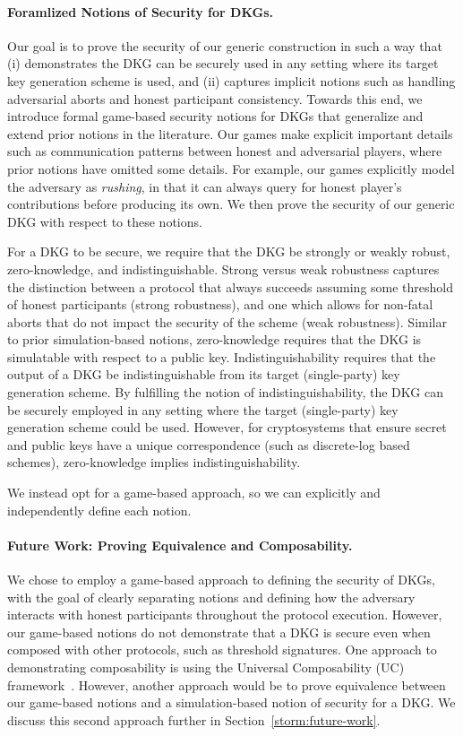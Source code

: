\paragraph{Foramlized Notions of Security for DKGs.}
Our goal is to prove the security of our generic construction in such a way that
(i) demonstrates the DKG can be securely used in any setting where its target key generation scheme is used,
and (ii) captures implicit notions such as handling adversarial aborts and honest participant consistency.
Towards this end,
we introduce formal game-based security notions for DKGs
that generalize and extend prior notions in the literature.
Our games make explicit important details such as communication patterns between honest and adversarial players,
where prior notions have omitted some details.
For example,
our games explicitly model the adversary as \emph{rushing},
in that it can always query for honest player's contributions before producing its own.
We then prove the security of our generic DKG with respect to these notions.

For a DKG to be secure, we require that the DKG  be strongly or weakly robust,
zero-knowledge, and
indistinguishable.
Strong versus weak robustness captures the distinction between a protocol that always succeeds assuming some threshold of honest participants (strong robustness),
and one which allows for non-fatal aborts that do not impact the security of the scheme (weak robustness).
Similar to prior simulation-based notions,
zero-knowledge requires that the DKG is simulatable with respect to a public
key.
Indistinguishability requires that the output of a DKG be indistinguishable from its target (single-party) key generation scheme.
By fulfilling the notion of indistinguishability,
the DKG can be securely employed in any setting where the target (single-party) key generation scheme could be used.
However,
for cryptosystems that ensure secret and public keys have a unique correspondence (such as discrete-log based schemes),
zero-knowledge implies indistinguishability.
%

We instead opt for a game-based approach,
so we can explicitly and independently define each notion.


\paragraph{Future Work: Proving Equivalence and Composability.}
We chose to employ a game-based approach to defining the security of DKGs,
with the goal of clearly separating notions and defining how the adversary interacts with honest participants throughout the protocol execution.
However, our game-based notions do not demonstrate that a DKG is secure even
when composed with other protocols,
such as threshold signatures.
One approach to demonstrating composability is using the Universal Composability (UC) framework~\cite{Canetti01}.
However, another approach would be to prove equivalence between our game-based
notions and a simulation-based notion of security for a DKG.
We discuss this second approach further in Section~\ref{storm:future-work}.

